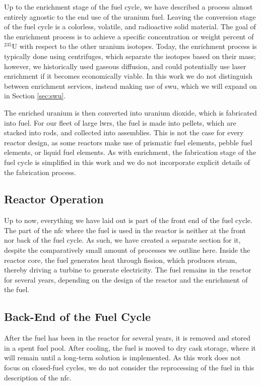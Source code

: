Up to the enrichment stage of the fuel cycle, we have described a process
almost entirely agnostic to the end use of the uranium fuel. Leaving the
conversion stage of the fuel cycle is a colorless, volatile, and radioactive
solid material. The goal of the enrichment process is to achieve a specific
concentration or weight percent of $^{235}$U with respect to the other uranium
isotopes. Today, the enrichment process is typically done using centrifuges,
which separate the isotopes based on their mass; however, we historically used
gaseous diffusion, and could potentially use laser enrichment if it becomes
economically viable. In this work we do not distinguish between enrichment
services, instead making use of \gls{swu}, which we will expand on in Section
\ref{sec:swu}.

The enriched uranium is then converted into uranium dioxide, which is
fabricated into fuel. For our fleet of large \glspl{lwr}, the fuel is made into
pellets, which are stacked into rods, and collected into assemblies. This is
not the case for every reactor design, as some reactors make use of prismatic
fuel elements, pebble fuel elements, or liquid fuel elements. As with
enrichment, the fabrication stage of the fuel cycle is simplified in this work
and we do not incorporate explicit details of the fabrication process.

\subsection{Reactor Operation}
\label{sec:reactor_operation}
Up to now, everything we have laid out is part of the front end of the fuel
cycle. The part of the \gls{nfc} where the fuel is used in the reactor is
neither at the front nor back of the fuel cycle. As such, we have created a
separate section for it, despite the comparatively small amount of processes we
outline here. Inside the reactor core, the fuel generates heat through fission,
which produces steam, thereby driving a turbine to generate electricity. The
fuel remains in the reactor for several years, depending on the design of the
reactor and the enrichment of the fuel. %


\subsection{Back-End of the Fuel Cycle}
\label{sec:back_end}
After the fuel has been in the reactor for several years, it is removed and
stored in a spent fuel pool. After cooling, the fuel is moved to dry cask
storage, where it will remain until a long-term solution is implemented. As
this work does not focus on closed-fuel cycles, we do not consider the
reprocessing of the fuel in this description of the \gls{nfc}.

